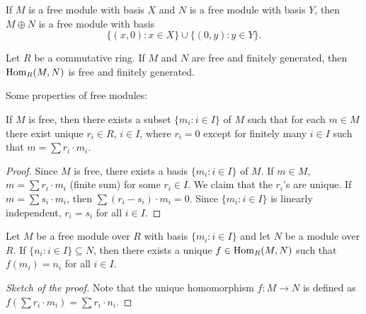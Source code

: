 \begin{example}
If $M$ is a free module with basis $X$ and $N$ 
is a free module with basis $Y$, then 
$M\oplus N$ is a free module with basis 
\[
\{(x,0):x\in X\}\cup \{(0,y):y\in Y\}.
\]	
\end{example}

\begin{exercise}
Let $R$ be a commutative ring. If $M$ and $N$ 
are free and finitely generated, then 
$\operatorname{Hom}_R(M,N)$
is free and finitely generated.
\end{exercise}

Some properties of free modules:

\begin{proposition}
If $M$ is free, then there exists a subset $\{m_i:i\in I\}$ of $M$ 
such that for each $m\in M$ there exist unique $r_i\in R$, $i\in I$, 
where $r_i=0$ except for finitely many $i\in I$ 
such that $m=\sum r_i\cdot m_i$. 
\end{proposition}

\begin{proof}
Since $M$ is free, there exists a basis $\{m_i:i\in I\}$ of $M$. If $m\in M$,
$m=\sum r_i\cdot m_i$ (finite sum) for some $r_i\in I$. We claim that
the $r_i$'s are unique. If $m=\sum s_i\cdot m_i$, then
$\sum (r_i-s_i)\cdot m_i=0$. Since $\{m_i:i\in I\}$ 
is linearly independent, $r_i=s_i$ for all $i\in I$.  	
\end{proof}

\begin{proposition}
\label{pro:libre}
Let $M$ be a free module over $R$ with basis $\{m_i:i\in I\}$ and let $N$ be a module over $R$. 
If $\{n_i:i\in I\}\subseteq N$, then 
there exists a unique $f\in\operatorname{Hom}_R(M,N)$ such that
$f(m_i)=n_i$ for all $i\in I$.  
\end{proposition}

\begin{proof}[Sketch of the proof]
Note that the unique homomorphism $f\colon M\to N$ is defined as 
$f(\sum r_i\cdot m_i)=\sum r_i\cdot n_i$.  	
\end{proof}

